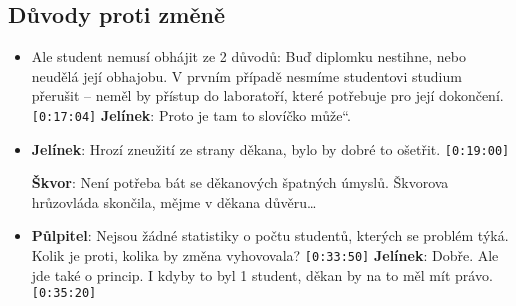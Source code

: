 \documentclass[a4paper,10pt,notitlepage]{article}
\newcommand{\ts}[1]{\texttt{[#1]}}
\newcommand{\cl}[1]{\noindent \textbf{#1}:}
\newcommand\uv[1]{\quotedblbase #1\textquotedblleft}%
\begin{document}
\subsection{Důvody proti změně}
\begin{itemize}
\item Ale student nemusí obhájit ze 2 důvodů: Buď diplomku nestihne, nebo neudělá její obhajobu. V prvním případě nesmíme studentovi studium přerušit -- neměl by přístup do laboratoří, které potřebuje pro její dokončení. \ts{0:17:04} \cl{Jelínek} Proto je tam to slovíčko \uv{může}.
  
\item \cl{Jelínek} Hrozí zneužití ze strany děkana, bylo by dobré to ošetřit. \ts{0:19:00}

\cl{Škvor} Není potřeba bát se děkanových špatných úmyslů. Škvorova hrůzovláda skončila, mějme v děkana důvěru\dots

\item \cl{Půlpitel} Nejsou žádné statistiky o počtu studentů, kterých se problém týká. Kolik je proti, kolika by změna vyhovovala? \ts{0:33:50} \cl{Jelínek} Dobře. Ale jde také o princip. I kdyby to byl 1 student, děkan by na to měl mít právo. \ts{0:35:20}

\end{itemize}
\end{document}
